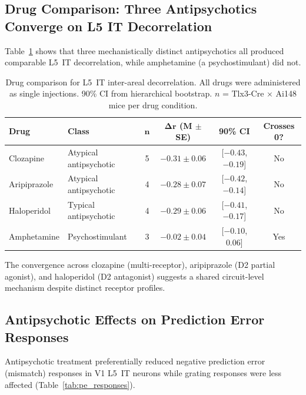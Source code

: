 \documentclass[11pt]{article}
\begin{document}
\subsection{Drug Comparison: Three Antipsychotics Converge on L5 IT Decorrelation}

Table~\ref{tab:drug_comparison} shows that three mechanistically distinct antipsychotics all produced comparable L5~IT decorrelation, while amphetamine (a psychostimulant) did not.

\begin{table}[H]
\centering
\caption{Drug comparison for L5~IT inter-areal decorrelation. All drugs were administered as single injections. 90\% CI from hierarchical bootstrap. $n$ = Tlx3-Cre $\times$ Ai148 mice per drug condition.}
\label{tab:drug_comparison}
\begin{tabular}{llcccc}
\toprule
\textbf{Drug} & \textbf{Class} & $\boldsymbol{n}$ & $\boldsymbol{\Delta r}$ \textbf{(M $\pm$ SE)} & \textbf{90\% CI} & \textbf{Crosses 0?} \\
\midrule
Clozapine & Atypical antipsychotic & 5 & $\mathbf{-0.31 \pm 0.06}$ & [$-0.43$, $-0.19$] & No \\
Aripiprazole & Atypical antipsychotic & 4 & $\mathbf{-0.28 \pm 0.07}$ & [$-0.42$, $-0.14$] & No \\
Haloperidol & Typical antipsychotic & 4 & $\mathbf{-0.29 \pm 0.06}$ & [$-0.41$, $-0.17$] & No \\
Amphetamine & Psychostimulant & 3 & $-0.02 \pm 0.04$ & [$-0.10$, $0.06$] & Yes \\
\bottomrule
\end{tabular}
\end{table}

The convergence across clozapine (multi-receptor), aripiprazole (D2 partial agonist), and haloperidol (D2 antagonist) suggests a shared circuit-level mechanism despite distinct receptor profiles.

\subsection{Antipsychotic Effects on Prediction Error Responses}

Antipsychotic treatment preferentially reduced negative prediction error (mismatch) responses in V1 L5~IT neurons while grating responses were less affected (Table~\ref{tab:pe_responses}).
\end{document}
